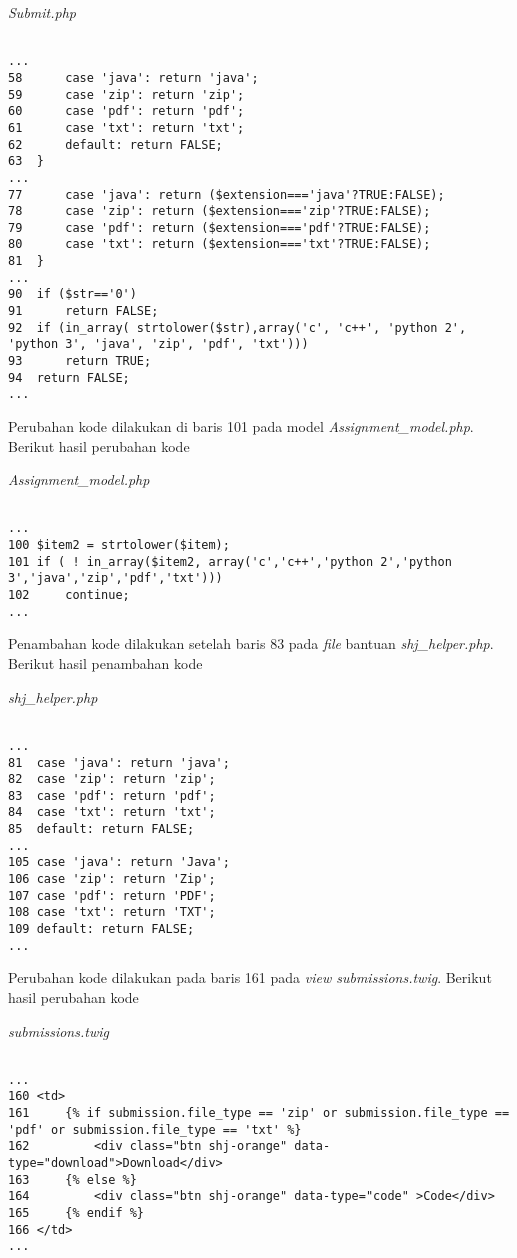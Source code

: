 \textit{Submit.php}
\begin{lstlisting}[basicstyle=\ttfamily, frame=single,
columns=fullflexible, keepspaces=true, breaklines=true]

...
58		case 'java': return 'java';
59		case 'zip': return 'zip';
60		case 'pdf': return 'pdf';
61		case 'txt': return 'txt';
62		default: return FALSE;
63	}
...
77		case 'java': return ($extension==='java'?TRUE:FALSE);
78		case 'zip': return ($extension==='zip'?TRUE:FALSE);
79		case 'pdf': return ($extension==='pdf'?TRUE:FALSE);
80		case 'txt': return ($extension==='txt'?TRUE:FALSE);
81	}
...
90	if ($str=='0')
91		return FALSE;
92	if (in_array( strtolower($str),array('c', 'c++', 'python 2', 'python 3', 'java', 'zip', 'pdf', 'txt')))
93		return TRUE;
94	return FALSE;
...

\end{lstlisting}

Perubahan kode dilakukan di baris 101 pada model \textit{Assignment\_model.php}. Berikut hasil perubahan kode 

\textit{Assignment\_model.php}
\begin{lstlisting}[basicstyle=\ttfamily, frame=single,
columns=fullflexible, keepspaces=true, breaklines=true]

...
100	$item2 = strtolower($item);
101	if ( ! in_array($item2, array('c','c++','python 2','python 3','java','zip','pdf','txt')))
102		continue;
...

\end{lstlisting}

Penambahan kode dilakukan setelah baris 83 pada \textit{file} bantuan \textit{shj\_helper.php}. Berikut hasil penambahan kode 

\textit{shj\_helper.php}
\begin{lstlisting}[basicstyle=\ttfamily, frame=single,
columns=fullflexible, keepspaces=true, breaklines=true]

...
81	case 'java': return 'java';
82	case 'zip': return 'zip';
83	case 'pdf': return 'pdf';
84	case 'txt': return 'txt';
85	default: return FALSE;
...
105	case 'java': return 'Java';
106	case 'zip': return 'Zip';
107	case 'pdf': return 'PDF';
108	case 'txt': return 'TXT';
109	default: return FALSE;
...

\end{lstlisting}

Perubahan kode dilakukan pada baris 161 pada \textit{view submissions.twig}. Berikut hasil perubahan kode

\textit{submissions.twig}
\begin{lstlisting}[basicstyle=\ttfamily, frame=single,
columns=fullflexible, keepspaces=true, breaklines=true]

...
160	<td>
161		{% if submission.file_type == 'zip' or submission.file_type == 'pdf' or submission.file_type == 'txt' %}
162			<div class="btn shj-orange" data-type="download">Download</div>
163		{% else %}
164			<div class="btn shj-orange" data-type="code" >Code</div>
165		{% endif %}
166	</td>
...

\end{lstlisting}

